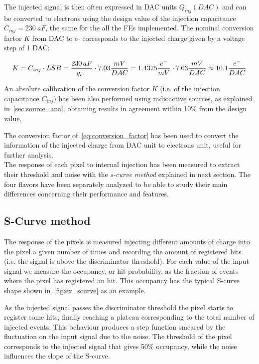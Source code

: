 The injected signal is then often expressed in DAC units $Q_{inj}(DAC)$ and can be converted to electrons using the design value of the injection capacitance \textbf{$C_{inj}= 230\ aF$}, the same for the all the FEs implemented.  
The nominal conversion factor $K$ from DAC to e- corresponds to the injected charge given by a voltage step of 1 DAC: 

\begin{equation}
\small
K = C_{inj} \cdot LSB = \frac{230 \, aF}{q_{{e}^{-}}} \cdot 7.03 \frac{mV}{DAC}= 1.4375 \frac{e^{-}}{mV} \cdot 7.03 \frac{mV}{DAC} \approx 10.1 \frac{e^{-}}{DAC}  
\label{eq:conversion_factor}
\end{equation}


An absolute calibration of the conversion factor $K$ (i.e. of the injection capacitance $C_{inj}$) has been also performed using radioactive sources, as explained in~\autoref{sec:source_ana}, obtaining results in agreement within 10$\%$ from the design value. 

The conversion factor of~\autoref{eq:conversion_factor} has been used to convert the information of the injected charge from DAC unit to electrons unit, useful for further analysis.
\\
The response of each pixel to internal injection has been measured to extract their threshold and noise with the \textit{s-curve method} explained in next section. 
The four flavors have been separately analyzed to be able to study their main differences concerning their performance and features. 


\subsection{S-Curve method} \label{sec:threshold_subsection}

The response of the pixels is measured injecting different amounts of charge into the pixel a given number of times and recording the amount of registered hits (i.e. the signal is above the discriminator threshold). For each value of the input signal we measure the occupancy, or hit probability, as the fraction of events where the pixel has registered an hit. This occupancy has the typical S-curve shape shown in~\autoref{fig:ex_scurve} as an example. 

As the injected signal passes the discriminator threshold the pixel starts to register some hits, finally reaching a plateau corresponding to the total number of injected events. This behaviour produces a step function smeared by the fluctuation on the input signal due to the noise.  
The threshold of the pixel corresponds to the injected signal  that gives 50\% occupancy, while the noise influences the slope of the S-curve.  

